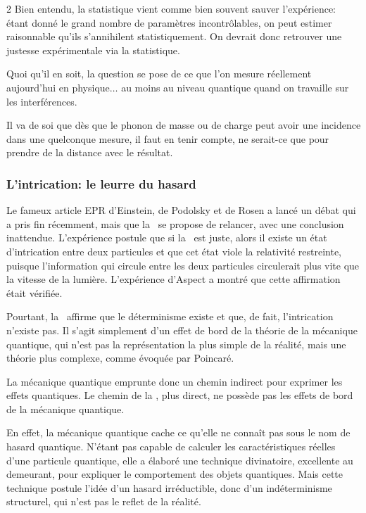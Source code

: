 \begin{multicols}{2}
Bien entendu, la statistique vient comme bien souvent sauver l'expérience:
étant donné le grand nombre de paramètres incontrôlables, on peut
estimer raisonnable qu'ils s'annihilent statistiquement. On devrait donc retrouver
une justesse expérimentale via la statistique.

Quoi qu'il en soit, la question se pose de ce que l'on mesure
réellement aujourd'hui en physique$\ldots$ au moins au niveau quantique
quand on travaille sur les interférences.

Il va de soi que dès que le phonon de masse ou de charge peut avoir
une incidence dans une quelconque mesure, il faut en tenir compte, ne
serait-ce que pour prendre de la distance avec le résultat.

\subsubsection{L'intrication: le leurre du hasard}

Le fameux article EPR\cite{einstein1935can} d'Einstein, de Podolsky et de Rosen a lancé un
débat qui a pris fin récemment, mais que la \PQ\ se propose de relancer,
avec une conclusion inattendue. L'expérience postule que si la \MQ\ est
juste, alors il existe un état d'intrication entre deux particules et
que cet état viole la relativité restreinte, puisque l'information qui
circule entre les deux particules circulerait plus vite que la vitesse
de la lumière. L'expérience d'Aspect\cite{aspect1982experimental} a montré que cette affirmation
était vérifiée.

Pourtant, la \PQ\ affirme que le déterminisme existe et que, de fait,
l'intrication n'existe pas. Il s'agit simplement d'un effet de bord de la
théorie de la mécanique quantique, qui n'est pas la représentation la plus simple de
la réalité, mais une théorie plus complexe, comme évoquée par Poincaré\cite{poincare:1902:sh}.

La mécanique quantique emprunte donc un chemin indirect pour exprimer les
effets quantiques. Le chemin de la \PQ, plus direct, ne possède
pas les effets de bord de la mécanique quantique.

En effet, la mécanique quantique cache ce qu'elle ne connaît pas sous le
nom de hasard quantique. N'étant pas capable de calculer les
caractéristiques réelles d'une particule quantique, elle a élaboré
une technique divinatoire, excellente au demeurant, pour expliquer le
comportement des objets quantiques. Mais cette technique postule
l'idée d'un hasard irréductible, donc d'un indéterminisme structurel,
qui n'est pas le reflet de la réalité.


\end{multicols}
